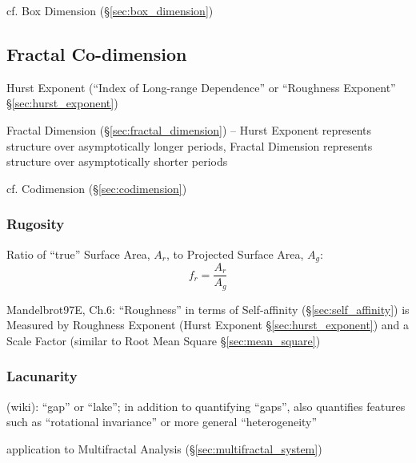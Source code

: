 cf. Box Dimension (\S\ref{sec:box_dimension})



\subsection{Fractal Co-dimension}\label{sec:fractal_codimension}

Hurst Exponent (``Index of Long-range Dependence'' or ``Roughness Exponent''
\S\ref{sec:hurst_exponent})

Fractal Dimension (\S\ref{sec:fractal_dimension}) -- Hurst Exponent represents
structure over asymptotically longer periods, Fractal Dimension represents
structure over asymptotically shorter periods

cf. Codimension (\S\ref{sec:codimension})



\subsubsection{Rugosity}\label{sec:rugosity}


Ratio of ``true'' Surface Area, $A_r$, to Projected Surface Area, $A_g$:
\[
  f_r = \frac{A_r}{A_g}
\]

Mandelbrot97E, Ch.6: ``Roughness'' in terms of Self-affinity
(\S\ref{sec:self_affinity}) is Measured by Roughness Exponent (Hurst Exponent
\S\ref{sec:hurst_exponent}) and a Scale Factor (similar to Root Mean Square
\S\ref{sec:mean_square})



\subsubsection{Lacunarity}\label{sec:lacunarity}


(wiki): ``gap'' or ``lake''; in addition to quantifying ``gaps'', also
quantifies features such as ``rotational invariance'' or more general
``heterogeneity''

application to Multifractal Analysis (\S\ref{sec:multifractal_system})



